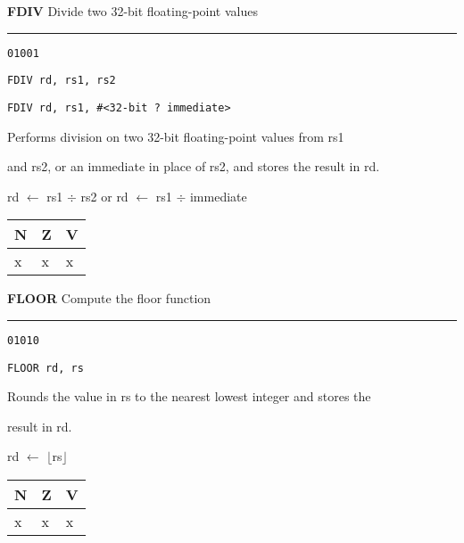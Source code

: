 \documentclass{article}
\begin{document}
\flushleft
\LARGE\textbf{FDIV} \large \hfill Divide two 32-bit floating-point values

\kern-3pt
\noindent\rule{16.5cm}{0.4pt}
\normalsize

{\large
	 \texttt{01001} \par
	\smallbreak
	 \texttt{FDIV rd, rs1, rs2} \par
	\smallbreak
	 \texttt{FDIV rd, rs1, \#<32-bit ? immediate>} \par
	\smallbreak
	 Performs division on two 32-bit floating-point values from rs1 \par
	\makebox[3.5cm][l]{  } and rs2, or an immediate in place of rs2, and stores the result in rd. \par
	\smallbreak
	 rd $\leftarrow$ rs1 $\div$ rs2 \quad or \quad rd $\leftarrow$ rs1 $\div$ immediate\par
	\smallbreak
	 \begin{tabular}{lll} N \quad & Z \quad & V \\ \hline x & x & x \\ \end{tabular}
}

\bigskip\bigskip

\flushleft
\LARGE\textbf{FLOOR} \large \hfill Compute the floor function

\kern-3pt
\noindent\rule{16.5cm}{0.4pt}
\normalsize

{\large
	 \texttt{01010} \par
	\smallbreak
	 \texttt{FLOOR rd, rs} \par
	\smallbreak
	 Rounds the value in rs to the nearest lowest integer and stores the \par
	\makebox[3.5cm][l]{  } result in rd. \par
	\smallbreak
	 rd $\leftarrow$ $\lfloor$rs$\rfloor$ \par
	\smallbreak
	 \begin{tabular}{lll} N \quad & Z \quad & V \\ \hline x & x & x \\ \end{tabular}
}

\pagebreak
\end{document}
